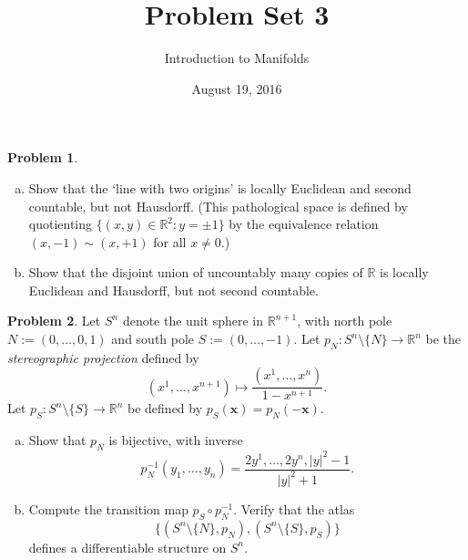 \documentclass{amsart}
\newcommand{\+}[1]{\ensuremath{\mathbf{#1}}}
\newcommand{\R}{{\mathbb R}}
\theoremstyle{definition}
\newtheorem{prob}{Problem}
\begin{document}
\title{Problem Set 3}
\date{August 19, 2016}
\author{Introduction to Manifolds}

\maketitle



\begin{prob}

 \begin{enumerate}[(a)]
  \item Show that the `line with two origins' is locally Euclidean and second
  countable, but not Hausdorff.  (This pathological space
  is defined by quotienting 
  $\{(x,y) \in \R^2: y = \pm 1\}$ by the equivalence relation
  $(x,-1) \sim (x, +1)$ for all $x \neq 0$.)
  \item Show that the disjoint union of uncountably many copies
  of $\R$ is locally Euclidean and Hausdorff, but not 
  second countable.
 \end{enumerate}
\end{prob}



\begin{prob}
Let $S^n$ denote the unit sphere in $\R^{n+1}$,
with north pole $N := (0,\ldots,0,1)$ and south pole
$S := (0,\ldots,-1)$.
Let $p_N: S^n \setminus \{N\} \to \R^n$ be the \emph{stereographic projection}
defined by
\[
(x^1,\ldots,x^{n+1}) \mapsto \frac{(x^1,\ldots,x^n)}{1-x^{n+1}}.
\]
Let $p_S: S^n \setminus \{S\} \to \R^n$ be defined by
$p_S(\+x) = p_N(-\+x)$.
\begin{enumerate}[(a)]
\item Show that $p_N$ is bijective, with inverse
\[
 p_N^{-1}(y_1,\ldots,y_n) = \frac{2y^1,\ldots,2y^n,|y|^2-1}{|y|^2+1}.
\]
\item Compute the transition map $p_S \circ p_N^{-1}$.
Verify that the atlas 
\[\{(S^n \setminus \{N\},p_N),(S^n \setminus \{S\},p_S)\}\]
defines a differentiable structure on $S^n$.
\end{enumerate}
\end{prob}
\end{document}
